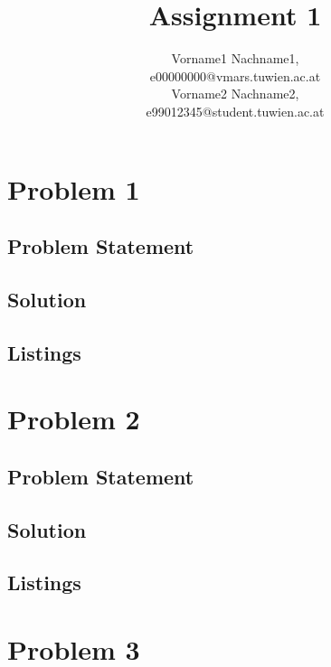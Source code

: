 \documentclass[12pt,a4paper,titlepage,oneside]{article}
\title{Assignment 1}
\author{Vorname1 Nachname1, \matrnr 0000000   \\
         {\small e00000000@vmars.tuwien.ac.at} \\
        Vorname2 Nachname2, \matrnr 99012345 \\
         {\small e99012345@student.tuwien.ac.at}
}
\begin{document}
\maketitle


\section{Problem 1}

\subsection{Problem Statement}


\subsection{Solution}

\subsection{Listings}

\newpage
\section{Problem 2}

\subsection{Problem Statement}


\subsection{Solution}

\subsection{Listings}

\newpage
\section{Problem 3}
\end{document}
